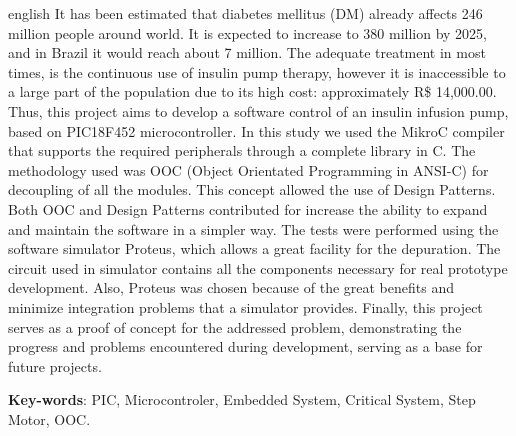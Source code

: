 \documentclass[	12pt, Times, openright, twoside, a4paper, english, brazil]{abntex2}
\begin{document}
\begin{resumo}[Abstract]
\begin{otherlanguage*}{english}
It has been estimated that diabetes mellitus (DM) already affects 246 million people around world. It is expected to increase to 380 million by 2025, and in Brazil it would reach about 7 million. The adequate treatment in most times, is the continuous use of insulin pump therapy, however it is inaccessible to a large part of the population due to its high cost: approximately R\$ 14,000.00. Thus, this project aims to develop a software control of an insulin infusion pump, based on PIC18F452 microcontroller. In this study we used the MikroC compiler that supports the required peripherals through a complete library in C. The methodology used was OOC (Object Orientated Programming in ANSI-C) for decoupling of all the modules. This concept allowed the use of Design Patterns. Both OOC and Design Patterns contributed for increase the ability to expand and maintain the software in a simpler way. The tests were performed using the software simulator Proteus, which allows a great facility for the depuration. The circuit used in simulator  contains all the components necessary for real prototype development. Also, Proteus was chosen because of the great benefits and minimize integration problems that a simulator provides. Finally, this project serves as a proof of concept for the addressed problem, demonstrating the progress and problems encountered during development, serving as a base for future projects.

   \vspace{\onelineskip}
 
   \noindent 
   \textbf{Key-words}: PIC, Microcontroler, Embedded System, Critical System, Step Motor, OOC.
\end{otherlanguage*}
\end{resumo}

\listoffigures*
\cleardoublepage

\end{document}
